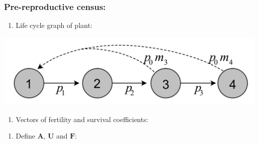 \documentclass[
]{book}
\newenvironment{Shaded}{\begin{snugshade}}{\end{snugshade}}
\newcommand{\CommentTok}[1]{\textcolor[rgb]{0.56,0.35,0.01}{\textit{#1}}}
\newcommand{\DecValTok}[1]{\textcolor[rgb]{0.00,0.00,0.81}{#1}}
\newcommand{\NormalTok}[1]{#1}
\newcommand{\OtherTok}[1]{\textcolor[rgb]{0.56,0.35,0.01}{#1}}
\newcommand{\SpecialCharTok}[1]{\textcolor[rgb]{0.00,0.00,0.00}{#1}}
\providecommand{\tightlist}{%
  \setlength{\itemsep}{0pt}\setlength{\parskip}{0pt}}
\begin{document}
\hypertarget{pre-reproductive-census-1}{%
\subsubsection*{Pre-reproductive census:}\label{pre-reproductive-census-1}}

\begin{enumerate}
\def\labelenumi{\arabic{enumi}.}
\tightlist
\item
  Life cycle graph of plant:
\end{enumerate}

\includegraphics[width=0.6\linewidth]{LifeCyclePlantPRE}

\begin{enumerate}
\def\labelenumi{\arabic{enumi}.}
\setcounter{enumi}{1}
\tightlist
\item
  Vectors of fertility and survival coefficients:
\end{enumerate}

\begin{Shaded}
\end{Shaded}

\begin{enumerate}
\def\labelenumi{\arabic{enumi}.}
\setcounter{enumi}{2}
\tightlist
\item
  Define \(\mathbf{A}\), \(\mathbf{U}\) and \(\mathbf{F}\):
\end{enumerate}
\end{document}
